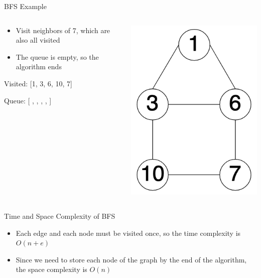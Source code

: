 \documentclass[
  ignorenonframetext,
]{beamer}
\begin{document}
\begin{frame}{BFS Example}
\protect\hypertarget{bfs-example-6}{}
\begin{columns}[T]
\begin{column}{0.6\textwidth}
\begin{itemize}
\item
  Visit neighbors of 7, which are also all visited
\item
  The queue is empty, so the algorithm ends \vspace{1cm}
\end{itemize}

Visited: {[}1, 3, 6, 10, 7{]}

Queue: {[} , , , , {]}
\end{column}

\begin{column}{0.4\textwidth}
\includegraphics{images/graph-bfs.png}
\end{column}
\end{columns}
\end{frame}

\begin{frame}{Time and Space Complexity of BFS}
\protect\hypertarget{time-and-space-complexity-of-bfs}{}
\begin{itemize}
\item
  Each edge and each node must be visited once, so the time complexity
  is \(O(n + e)\)
\item
  Since we need to store each node of the graph by the end of the
  algorithm, the space complexity is \(O(n)\)
\end{itemize}
\end{frame}
\end{document}

